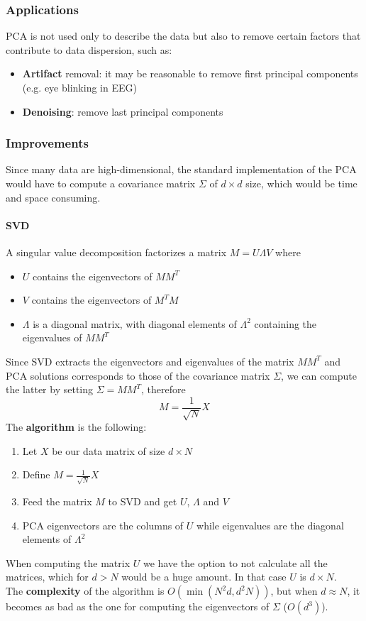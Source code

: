 \subsubsection{Applications}
PCA is not used only to describe the data but also to remove certain factors that contribute to data dispersion, such as:
\begin{itemize}
	\item \textbf{Artifact} removal: it may be reasonable to remove first principal components (e.g. eye blinking in EEG)
	\item \textbf{Denoising}: remove last principal components
\end{itemize}
\subsubsection{Improvements}
Since many data are high-dimensional, the standard implementation of the PCA would have to compute a covariance matrix $\Sigma$ of $d \times d$ size, which would be time and space consuming.
\paragraph{SVD}
\begin{definition}[SVD]
	A singular value decomposition factorizes a matrix $M = U \Lambda V$ where
	\begin{itemize}
		\item $U$ contains the eigenvectors of $MM^T$
		\item $V$ contains the eigenvectors of $M^TM$
		\item $\Lambda$ is a diagonal matrix, with diagonal elements of $\Lambda^2$ containing the eigenvalues of $MM^T$
	\end{itemize}
\end{definition}
Since SVD extracts the eigenvectors and eigenvalues of the matrix $MM^T$ and PCA solutions corresponds to those of the covariance matrix $\Sigma$, we can compute the latter by setting $\Sigma = MM^T$, therefore
\begin{equation}
	M = \frac{1}{\sqrt{N}}X
\end{equation}
The \textbf{algorithm} is the following:
\begin{enumerate}
	\item Let $X$ be our data matrix of size $d \times N$
	\item Define $M = \frac{1}{\sqrt{N}}X$
	\item Feed the matrix $M$ to SVD and get $U$, $\Lambda$ and $V$
	\item PCA eigenvectors are the columns of $U$ while eigenvalues are the diagonal elements of $\Lambda^2$
\end{enumerate}
When computing the matrix $U$ we have the option to not calculate all the matrices, which for $d>N$ would be a huge amount. In that case $U$ is $d \times N$.\\
The \textbf{complexity} of the algorithm is $O(\min(N^2d,d^2N))$, but when $d \approx N$, it becomes as bad as the one for computing the eigenvectors of $\Sigma$ ($O(d^3)$).

